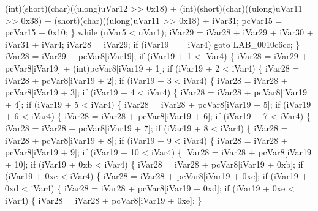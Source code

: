\documentclass[
]{article}
\newenvironment{Shaded}{}{}
\newcommand{\NormalTok}[1]{#1}
\begin{document}
\begin{Shaded}
\begin{Highlighting}[]
\NormalTok{                 (int)(short)(char)((ulong)uVar12 \textgreater{}\textgreater{} 0x18) +}
\NormalTok{                 (int)(short)(char)((ulong)uVar11 \textgreater{}\textgreater{} 0x38) +}
\NormalTok{                 (short)(char)((ulong)uVar11 \textgreater{}\textgreater{} 0x18) + iVar31;}
\NormalTok{        pcVar15 = pcVar15 + 0x10;}
\NormalTok{      \} while (uVar5 \textless{} uVar1);}
\NormalTok{      iVar29 = iVar28 + iVar29 + iVar30 + iVar31 + iVar4;}
\NormalTok{      iVar28 = iVar29;}
\NormalTok{      if (iVar19 == iVar4) goto LAB\_0010c6cc;}
\NormalTok{    \}}
\NormalTok{    iVar28 = iVar29 + pcVar8[iVar19];}
\NormalTok{    if (iVar19 + 1 \textless{} iVar4) \{}
\NormalTok{      iVar28 = iVar29 + pcVar8[iVar19] + (int)pcVar8[iVar19 + 1];}
\NormalTok{      if (iVar19 + 2 \textless{} iVar4) \{}
\NormalTok{        iVar28 = iVar28 + pcVar8[iVar19 + 2];}
\NormalTok{        if (iVar19 + 3 \textless{} iVar4) \{}
\NormalTok{          iVar28 = iVar28 + pcVar8[iVar19 + 3];}
\NormalTok{          if (iVar19 + 4 \textless{} iVar4) \{}
\NormalTok{            iVar28 = iVar28 + pcVar8[iVar19 + 4];}
\NormalTok{            if (iVar19 + 5 \textless{} iVar4) \{}
\NormalTok{              iVar28 = iVar28 + pcVar8[iVar19 + 5];}
\NormalTok{              if (iVar19 + 6 \textless{} iVar4) \{}
\NormalTok{                iVar28 = iVar28 + pcVar8[iVar19 + 6];}
\NormalTok{                if (iVar19 + 7 \textless{} iVar4) \{}
\NormalTok{                  iVar28 = iVar28 + pcVar8[iVar19 + 7];}
\NormalTok{                  if (iVar19 + 8 \textless{} iVar4) \{}
\NormalTok{                    iVar28 = iVar28 + pcVar8[iVar19 + 8];}
\NormalTok{                    if (iVar19 + 9 \textless{} iVar4) \{}
\NormalTok{                      iVar28 = iVar28 + pcVar8[iVar19 + 9];}
\NormalTok{                      if (iVar19 + 10 \textless{} iVar4) \{}
\NormalTok{                        iVar28 = iVar28 + pcVar8[iVar19 + 10];}
\NormalTok{                        if (iVar19 + 0xb \textless{} iVar4) \{}
\NormalTok{                          iVar28 = iVar28 + pcVar8[iVar19 + 0xb];}
\NormalTok{                          if (iVar19 + 0xc \textless{} iVar4) \{}
\NormalTok{                            iVar28 = iVar28 + pcVar8[iVar19 + 0xc];}
\NormalTok{                            if (iVar19 + 0xd \textless{} iVar4) \{}
\NormalTok{                              iVar28 = iVar28 + pcVar8[iVar19 + 0xd];}
\NormalTok{                              if (iVar19 + 0xe \textless{} iVar4) \{}
\NormalTok{                                iVar28 = iVar28 + pcVar8[iVar19 + 0xe];}
\NormalTok{                              \}}

\end{Highlighting}
\end{Shaded}
\end{document}
